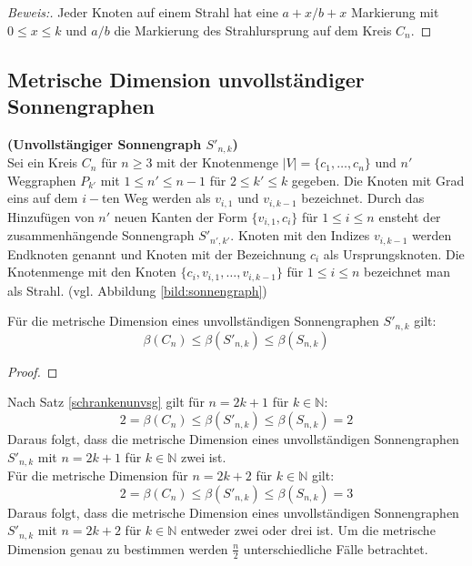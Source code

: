 \begin{proof}[Beweis:]
Jeder Knoten auf einem Strahl hat eine $a+x/b+x$ Markierung mit $0 \leq x \leq k$ und $a/b$ die Markierung des Strahlursprung auf dem Kreis $C_n$.
\end{proof}
\subsection{Metrische Dimension unvollständiger Sonnengraphen}  	 
\begin{defi}{\textbf{(Unvollstängiger Sonnengraph $S'_{n,k}$)}}\\
Sei ein Kreis $C_n$ für $n \geq 3$ mit der Knotenmenge $|V|=\{ c_1, \ldots , c_n \}$ und $n'$ Weggraphen $P_{k'}$ mit $1 \leq n' \leq n-1$ für $2 \leq k' \leq k$ gegeben. Die Knoten mit Grad eins auf dem $i-$ten Weg werden als $v_{i,1}$ und $v_{i,k-1}$ bezeichnet. Durch das Hinzufügen von $n'$ neuen Kanten der Form $\{v_{i,1},c_i\}$ für $1 \leq i \leq n$ ensteht der zusammenhängende Sonnengraph $S'_{n',k'}$. Knoten mit den Indizes $v_{i,k-1}$ werden Endknoten genannt und Knoten mit der Bezeichnung $c_i$ als Ursprungsknoten. Die Knotenmenge mit den Knoten $\{c_i,v_{i,1}, \ldots ,v_{i,k-1}\}$ für $1 \leq i \leq n$ bezeichnet man als Strahl. (vgl. Abbildung \ref{bild:sonnengraph})
\end{defi}
\begin{satz}
\label{schrankenunvsg}
Für die metrische Dimension eines unvollständigen Sonnengraphen $S'_{n,k}$ gilt:
$$\beta(C_n) \leq \beta(S'_{n,k})\leq \beta(S_{n,k})$$
\end{satz}
\begin{proof}
\end{proof}
\begin{bem}
Nach Satz \ref{schrankenunvsg} gilt für $n=2k+1$ für $k \in \mathbb{N}$: $$2=\beta(C_n) \leq \beta(S'_{n,k})\leq \beta(S_{n,k})=2$$
Daraus folgt, dass die metrische Dimension eines unvollständigen Sonnengraphen $S'_{n,k}$ mit $n=2k+1$ für $k \in \mathbb{N}$ zwei ist.\\
Für die metrische Dimension für $n=2k+2$ für $k \in \mathbb{N}$ gilt: $$2=\beta(C_n) \leq \beta(S'_{n,k})\leq \beta(S_{n,k})=3$$
Daraus folgt, dass die metrische Dimension eines unvollständigen Sonnengraphen $S'_{n,k}$ mit $n=2k+2$ für $k \in \mathbb{N}$ entweder zwei oder drei ist. Um die metrische Dimension genau zu bestimmen werden $\frac{n}{2}$ unterschiedliche Fälle betrachtet.
\end{bem}
